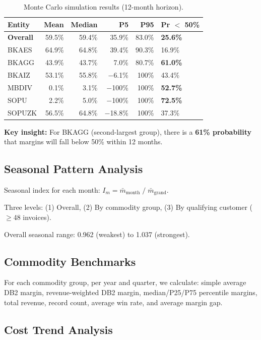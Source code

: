\documentclass[11pt,a4paper]{article}
\begin{document}
\begin{table}[H]
\centering
\begin{tabular}{lrrrrl}
\toprule
\textbf{Entity} & \textbf{Mean} & \textbf{Median} & \textbf{P5} & \textbf{P95} & \textbf{Pr $<$ 50\%} \\
\midrule
\textbf{Overall} & 59.5\% & 59.4\% & 35.9\% & 83.0\% & \textbf{25.6\%} \\
BKAES   & 64.9\% & 64.8\% & 39.4\% & 90.3\% & 16.9\% \\
BKAGG   & 43.9\% & 43.7\% & 7.0\%  & 80.7\% & \textbf{61.0\%} \\
BKAIZ   & 53.1\% & 55.8\% & $-$6.1\%  & 100\% & 43.4\% \\
MBDIV   & 0.1\%  & 3.1\%  & $-$100\% & 100\% & \textbf{52.7\%} \\
SOPU    & 2.2\%  & 5.0\%  & $-$100\% & 100\% & \textbf{72.5\%} \\
SOPUZK  & 56.5\% & 64.8\% & $-$18.8\% & 100\% & 37.3\% \\
\bottomrule
\end{tabular}
\caption{Monte Carlo simulation results (12-month horizon).}
\end{table}

\textbf{Key insight:} For BKAGG (second-largest group), there is a \textbf{61\% probability} that margins will fall below 50\% within 12 months.

\subsection{Seasonal Pattern Analysis}

Seasonal index for each month: $I_m = \bar{m}_{\text{month}} \;/\; \bar{m}_{\text{grand}}$.

Three levels: (1) Overall, (2) By commodity group, (3) By qualifying customer ($\geq$48 invoices).

Overall seasonal range: 0.962 (weakest) to 1.037 (strongest).

\subsection{Commodity Benchmarks}

For each commodity group, per year and quarter, we calculate: simple average DB2 margin, revenue-weighted DB2 margin, median/P25/P75 percentile margins, total revenue, record count, average win rate, and average margin gap.

\subsection{Cost Trend Analysis}
\end{document}
